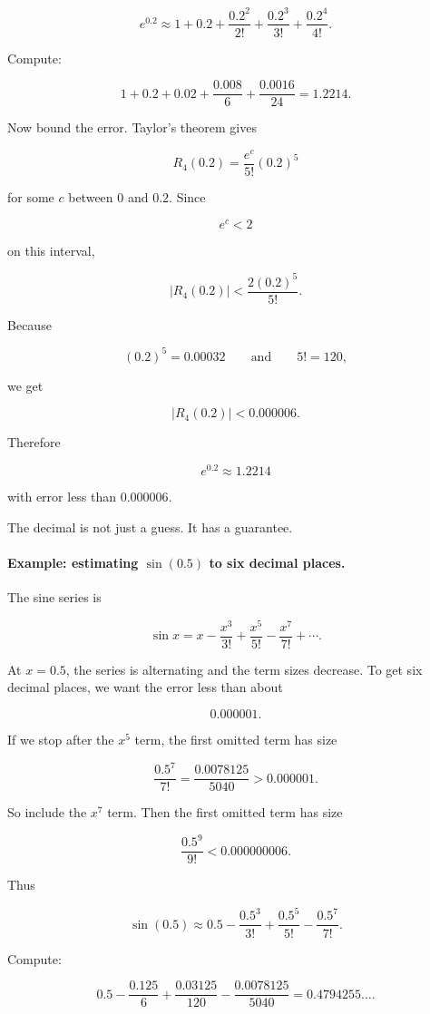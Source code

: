 \[
e^{0.2}
\approx
1+0.2+\frac{0.2^2}{2!}+\frac{0.2^3}{3!}+\frac{0.2^4}{4!}.
\]

Compute:

\[
1+0.2+0.02+\frac{0.008}{6}+\frac{0.0016}{24}
=
1.2214.
\]

Now bound the error.  Taylor's theorem gives

\[
R_4(0.2)=\frac{e^c}{5!}(0.2)^5
\]

for some \(c\) between \(0\) and \(0.2\).  Since

\[
e^c<2
\]

on this interval,

\[
|R_4(0.2)|
<
\frac{2(0.2)^5}{5!}.
\]

Because

\[
(0.2)^5=0.00032
\qquad\text{and}\qquad
5!=120,
\]

we get

\[
|R_4(0.2)|<0.000006.
\]

Therefore

\[
\boxed{
e^{0.2}\approx1.2214
}
\]

with error less than \(0.000006\).

The decimal is not just a guess.  It has a guarantee.

\paragraph{Example: estimating \(\sin(0.5)\) to six decimal places.}
The sine series is

\[
\sin x=
x-\frac{x^3}{3!}+\frac{x^5}{5!}-\frac{x^7}{7!}+\cdots.
\]

At \(x=0.5\), the series is alternating and the term sizes decrease.  To get six decimal
places, we want the error less than about

\[
0.000001.
\]

If we stop after the \(x^5\) term, the first omitted term has size

\[
\frac{0.5^7}{7!}
=
\frac{0.0078125}{5040}
>
0.000001.
\]

So include the \(x^7\) term.  Then the first omitted term has size

\[
\frac{0.5^9}{9!}
<0.000000006.
\]

Thus

\[
\sin(0.5)
\approx
0.5-\frac{0.5^3}{3!}
+\frac{0.5^5}{5!}
-\frac{0.5^7}{7!}.
\]

Compute:

\[
0.5-\frac{0.125}{6}
+\frac{0.03125}{120}
-\frac{0.0078125}{5040}
=
0.4794255\ldots.
\]

